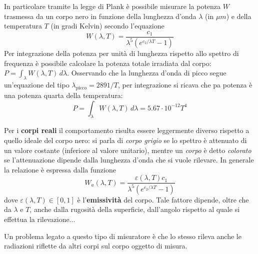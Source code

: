 	In particolare tramite la legge di Plank è possibile misurare la potenza $W$ trasmessa da un corpo nero in funzione della lunghezza d'onda $\lambda$ (in $\mu m$) e della temperatura $T$ (in gradi Kelvin) secondo l'equazione
	\[ W(\lambda, T) =  \frac{ c_1  }{\lambda^5\left(e^{c_2/\lambda T} - 1\right)}\]
	Per integrazione della potenza per unità di lunghezza rispetto allo spettro di frequenza è possibile calcolare la potenza totale irradiata dal corpo: $P = \int_\lambda W(\lambda, T)\, d\lambda$. Osservando che la lunghezza d'onda di picco segue un'equazione del tipo $\lambda_\textrm{picco} = 2891/T$, per integrazione si ricava che pa potenza è una potenza quarta della temperatura:
	\[ P =\int_\lambda W(\lambda, T)\, d\lambda = 5.67  \cdot 10^{-12} T^4 \]
	
	Per i \textbf{corpi reali} il comportamento risulta essere leggermente diverso rispetto a quello ideale del corpo nero: si parla di \textit{corpo grigio} se lo spettro è attenuato di un valore costante (inferiore al valore unitario), mentre un \textit{corpo} è detto \textit{colorato} se l'attenuazione dipende dalla lunghezza d'onda che si vuole rilevare. In generale la relazione è espressa dalla funzione
	\[ W_a(\lambda, T) =\frac{\varepsilon(\lambda,T) c_1}{\lambda^5\left(e^{c_2/\lambda T} - 1\right)} \]
	dove $\varepsilon(\lambda, T) \in [0,1]$ è l'\textbf{emissività} del corpo. Tale fattore dipende, oltre che da $\lambda$ e $T$, anche dalla rugosità della superficie, dall'angolo rispetto al quale si effettua la rilevazione... 
	
	Un problema legato a questo tipo di misuratore è che lo stesso rileva anche le radiazioni riflette da altri corpi sul corpo oggetto di misura.
	
	